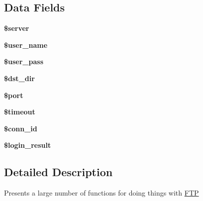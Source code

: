 \subsection*{Data Fields}
\begin{DoxyCompactItemize}
\item 
\hypertarget{class_f_t_p_ad135cc8a47e55f0829949cf62214170f}{{\bfseries \$server}}\label{class_f_t_p_ad135cc8a47e55f0829949cf62214170f}

\item 
\hypertarget{class_f_t_p_a768c773a5f9a6258343b30f3205f528f}{{\bfseries \$user\-\_\-name}}\label{class_f_t_p_a768c773a5f9a6258343b30f3205f528f}

\item 
\hypertarget{class_f_t_p_a6c04a30aeffe3c902d47ab40cef0067e}{{\bfseries \$user\-\_\-pass}}\label{class_f_t_p_a6c04a30aeffe3c902d47ab40cef0067e}

\item 
\hypertarget{class_f_t_p_a940ba9a539834a62a874504c763310b7}{{\bfseries \$dst\-\_\-dir}}\label{class_f_t_p_a940ba9a539834a62a874504c763310b7}

\item 
\hypertarget{class_f_t_p_aa0787efab4b22e8a212882f3409d4c77}{{\bfseries \$port}}\label{class_f_t_p_aa0787efab4b22e8a212882f3409d4c77}

\item 
\hypertarget{class_f_t_p_a84320a9bf3e591d7ae20dfcb0dfe6a0d}{{\bfseries \$timeout}}\label{class_f_t_p_a84320a9bf3e591d7ae20dfcb0dfe6a0d}

\item 
\hypertarget{class_f_t_p_a16c23f1dcbfed2f2759f5e54f604106d}{{\bfseries \$conn\-\_\-id}}\label{class_f_t_p_a16c23f1dcbfed2f2759f5e54f604106d}

\item 
\hypertarget{class_f_t_p_ac4190102e921832ca6c7abbde63769d7}{{\bfseries \$login\-\_\-result}}\label{class_f_t_p_ac4190102e921832ca6c7abbde63769d7}

\end{DoxyCompactItemize}


\subsection{Detailed Description}
Presents a large number of functions for doing things with \hyperlink{class_f_t_p}{F\-T\-P} 

